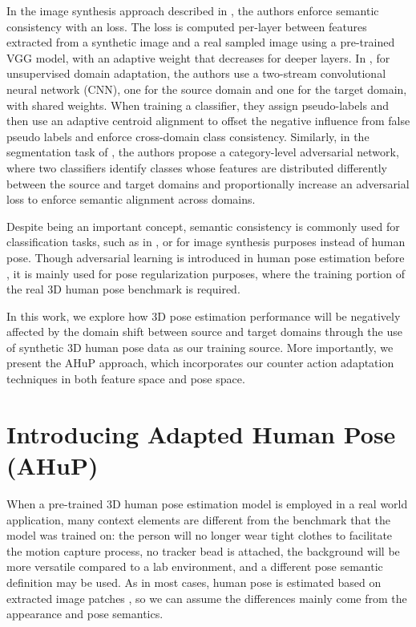 \documentclass[twocolumn]{svjour3}          \smartqed  \usepackage{graphicx}
\begin{document}
In the image synthesis approach described in \cite{Wang_2019_CVPR}, the authors enforce semantic consistency with an  loss. The loss is computed per-layer between features extracted from a synthetic image and a real sampled image using a pre-trained VGG model, with an adaptive weight that decreases for deeper layers.  In \cite{10.1145/3357384.3357918}, for unsupervised domain adaptation, the authors use a two-stream convolutional neural network (CNN), one for the source domain and one for the target domain, with shared weights. When training a classifier, they assign pseudo-labels and then use an adaptive centroid alignment to offset the negative influence from false pseudo labels and enforce cross-domain class consistency. Similarly, in the segmentation task of \cite{Luo_2019_CVPR}, the authors propose a category-level adversarial network, where two classifiers identify classes whose features are distributed differently between the source and target domains and proportionally increase an adversarial loss to enforce semantic alignment across domains. 

Despite being an important concept, semantic consistency is 
commonly used for classification tasks, such as in \mbox{\cite{Luo_2019_CVPR,Morgado_2017_CVPR}}, or for image synthesis purposes \mbox{\cite{Wang_2019_CVPR}} instead of human pose.
Though adversarial learning is introduced in human pose estimation before \cite{yang20183d}, it is mainly used for pose regularization purposes, where the training portion of the real 3D human pose benchmark is required.

In this work, we  explore how 3D pose estimation performance will be negatively affected by the domain shift between source and target domains through the use of synthetic 3D human pose data as our training source. More importantly, we present the AHuP approach, which incorporates our counter action adaptation techniques in both feature space and pose space.  


\section{Introducing Adapted Human Pose (AHuP)}
When a pre-trained 3D human pose estimation model is employed in a real world application, many context elements are different from the  benchmark that the model was trained on: the person will no longer wear tight clothes to facilitate the motion capture process, no tracker bead is attached, the background will be more versatile compared to a lab environment, and a different pose semantic definition may be used. 
As in most cases, human pose is estimated based on extracted image patches \cite{zhou2017towards,moon2019camera}, so we can assume the  differences  mainly come from the appearance and pose semantics. 
\end{document}
